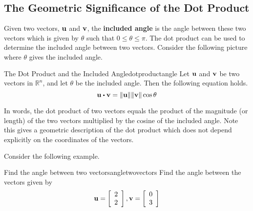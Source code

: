 \subsection{The Geometric Significance of the Dot Product}

Given two vectors, ${\bf u}$ and ${\bf v}$, the \textbf{included angle}
  is the angle between these two vectors which
is given by $\theta$ such that $0 \leq \theta \leq \pi$. The dot product can be used to
determine the included angle between two vectors. Consider the following picture where $\theta$ gives the included angle. 

\begin{center}
\end{center}

\begin{proposition}{The Dot Product and the Included Angle}{dotproductangle}
Let ${\bf u}$ and ${\bf v}$ be two vectors in $\mathbb{R}^n$, and let 
$\theta$ be the included angle. Then the following equation holds.
\begin{equation*}
\vect{u}\dotprod \vect{v}=\vectlength \vect{u}\vectlength \vectlength \vect{v}
\vectlength \cos \theta 
\end{equation*}
\end{proposition}

In words, the dot product of two vectors equals the product of
the magnitude (or length) of the two vectors multiplied by the cosine of the included
angle. Note this gives a geometric description of the dot product which does
not depend explicitly on the coordinates of the vectors.

Consider the following example.

\begin{example}{Find the angle between two vectors}{angletwovectors}
Find the angle between the vectors given by 
\begin{equation*}
{\bf u}
=
\left[
\begin{array}{r}
2 \\
2
\end{array}
\right], 
{\bf v}
=
\left[
\begin{array}{r}
0 \\
3 
\end{array}
\right]
\end{equation*}
\end{example}

